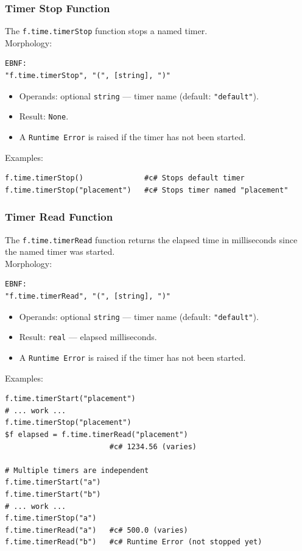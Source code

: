 \subsubsection{Timer Stop Function}
The \texttt{f.time.timerStop} function stops a named timer. \\
Morphology:
\begin{verbatim}
EBNF:
"f.time.timerStop", "(", [string], ")"
\end{verbatim}
\begin{itemize}
\item Operands: optional \texttt{string} --- timer name (default: \texttt{"default"}).
\item Result: \texttt{None}.
\item A \texttt{Runtime Error} is raised if the timer has not been started.
\end{itemize}
Examples:
\begin{verbatim}
f.time.timerStop()              #c# Stops default timer
f.time.timerStop("placement")   #c# Stops timer named "placement"
\end{verbatim}

\subsubsection{Timer Read Function}
The \texttt{f.time.timerRead} function returns the elapsed time in milliseconds since the named timer was started. \\
Morphology:
\begin{verbatim}
EBNF:
"f.time.timerRead", "(", [string], ")"
\end{verbatim}
\begin{itemize}
\item Operands: optional \texttt{string} --- timer name (default: \texttt{"default"}).
\item Result: \texttt{real} --- elapsed milliseconds.
\item A \texttt{Runtime Error} is raised if the timer has not been started.
\end{itemize}
Examples:
\begin{verbatim}
f.time.timerStart("placement")
# ... work ...
f.time.timerStop("placement")
$f elapsed = f.time.timerRead("placement")
                        #c# 1234.56 (varies)

# Multiple timers are independent
f.time.timerStart("a")
f.time.timerStart("b")
# ... work ...
f.time.timerStop("a")
f.time.timerRead("a")   #c# 500.0 (varies)
f.time.timerRead("b")   #c# Runtime Error (not stopped yet)
\end{verbatim}

